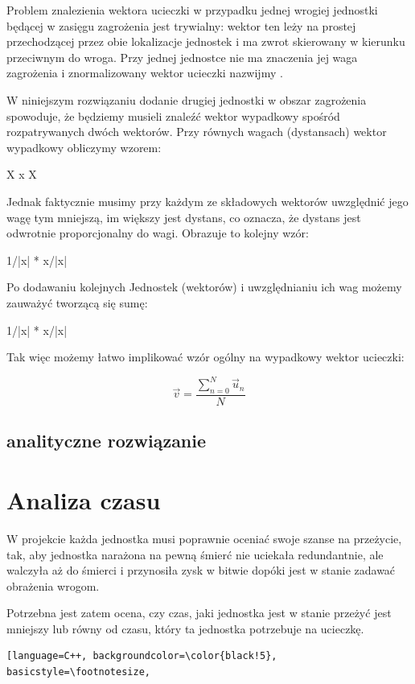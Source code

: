\documentclass[12pt]{report}
\begin{document}
Problem znalezienia wektora ucieczki w przypadku jednej wrogiej jednostki będącej w zasięgu zagrożenia jest trywialny:
wektor ten leży na prostej przechodzącej przez obie lokalizacje jednostek i ma zwrot skierowany w kierunku przeciwnym do wroga. Przy jednej jednostce nie ma znaczenia jej waga zagrożenia i znormalizowany wektor ucieczki nazwijmy .


W niniejszym rozwiązaniu dodanie drugiej jednostki w obszar zagrożenia spowoduje, że będziemy musieli znaleźć wektor wypadkowy spośród rozpatrywanych dwóch wektorów. Przy równych wagach (dystansach) wektor wypadkowy obliczymy wzorem:

X x X

Jednak faktycznie musimy przy każdym ze składowych wektorów uwzględnić jego wagę tym mniejszą, im większy jest dystans, co oznacza, że dystans jest odwrotnie proporcjonalny do wagi. Obrazuje to kolejny wzór:

1/|x| * x/|x|

Po dodawaniu kolejnych Jednostek (wektorów) i uwzględnianiu ich wag możemy zauważyć tworzącą się sumę:




1/|x| * x/|x|

Tak więc możemy łatwo implikować wzór ogólny na wypadkowy wektor ucieczki:

$$\vec v = \dfrac{\sum_{n=0}^{N}  \vec u_n}{N}   $$

\subsection{analityczne rozwiązanie}



\section{Analiza czasu}
W projekcie każda jednostka musi poprawnie oceniać swoje szanse na przeżycie, tak, aby jednostka narażona na pewną śmierć nie uciekała redundantnie, ale walczyła aż do śmierci i przynosiła zysk w bitwie dopóki jest w stanie zadawać obrażenia wrogom.

Potrzebna jest zatem ocena, czy czas, jaki jednostka jest w stanie przeżyć jest mniejszy lub równy od czasu, który ta jednostka potrzebuje na ucieczkę.

\begin{lstlisting}[language=C++, backgroundcolor=\color{black!5}, basicstyle=\footnotesize, 

\end{lstlisting}
\end{document}

